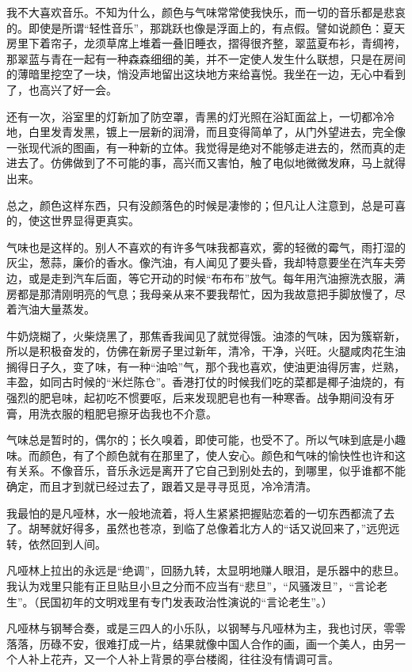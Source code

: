 \par 我不大喜欢音乐。不知为什么，颜色与气味常常使我快乐，而一切的音乐都是悲哀的。即使是所谓“轻性音乐”，那跳跃也像是浮面上的，有点假。譬如说颜色：夏天房里下着帘子，龙须草席上堆着一叠旧睡衣，摺得很齐整，翠蓝夏布衫，青绸袴，那翠蓝与青在一起有一种森森细细的美，并不一定使人发生什么联想，只是在房间的薄暗里挖空了一块，悄没声地留出这块地方来给喜悦。我坐在一边，无心中看到了，也高兴了好一会。
\par 还有一次，浴室里的灯新加了防空罩，青黑的灯光照在浴缸面盆上，一切都冷冷地，白里发青发黑，镀上一层新的润滑，而且变得简单了，从门外望进去，完全像一张现代派的图画，有一种新的立体。我觉得是绝对不能够走进去的，然而真的走进去了。仿佛做到了不可能的事，高兴而又害怕，触了电似地微微发麻，马上就得出来。
\par 总之，颜色这样东西，只有没颜落色的时候是凄惨的；但凡让人注意到，总是可喜的，使这世界显得更真实。
\par 气味也是这样的。别人不喜欢的有许多气味我都喜欢，雾的轻微的霉气，雨打湿的灰尘，葱蒜，廉价的香水。像汽油，有人闻见了要头昏，我却特意要坐在汽车夫旁边，或是走到汽车后面，等它开动的时候“布布布”放气。每年用汽油擦洗衣服，满房都是那清刚明亮的气息；我母亲从来不要我帮忙，因为我故意把手脚放慢了，尽着汽油大量蒸发。
\par 牛奶烧糊了，火柴烧黑了，那焦香我闻见了就觉得饿。油漆的气味，因为簇崭新，所以是积极奋发的，仿佛在新房子里过新年，清冷，干净，兴旺。火腿咸肉花生油搁得日子久，变了味，有一种“油哈”气，那个我也喜欢，使油更油得厉害，烂熟，丰盈，如同古时候的“米烂陈仓”。香港打仗的时候我们吃的菜都是椰子油烧的，有强烈的肥皂味，起初吃不惯要呕，后来发现肥皂也有一种寒香。战争期间没有牙膏，用洗衣服的粗肥皂擦牙齿我也不介意。
\par 气味总是暂时的，偶尔的；长久嗅着，即使可能，也受不了。所以气味到底是小趣味。而颜色，有了个颜色就有在那里了，使人安心。颜色和气味的愉快性也许和这有关系。不像音乐，音乐永远是离开了它自己到别处去的，到哪里，似乎谁都不能确定，而且才到就已经过去了，跟着又是寻寻觅觅，冷冷清清。
\par 我最怕的是凡哑林，水一般地流着，将人生紧紧把握贴恋着的一切东西都流了去了。胡琴就好得多，虽然也苍凉，到临了总像着北方人的“话又说回来了，”远兜远转，依然回到人间。
\par 凡哑林上拉出的永远是“绝调”，回肠九转，太显明地赚人眼泪，是乐器中的悲旦。我认为戏里只能有正旦贴旦小旦之分而不应当有“悲旦”，“风骚泼旦”，“言论老生”。（民国初年的文明戏里有专门发表政治性演说的“言论老生”。）
\par 凡哑林与钢琴合奏，或是三四人的小乐队，以钢琴与凡哑林为主，我也讨厌，零零落落，历碌不安，很难打成一片，结果就像中国人合作的画，画一个美人，由另一个人补上花卉，又一个人补上背景的亭台楼阁，往往没有情调可言。
